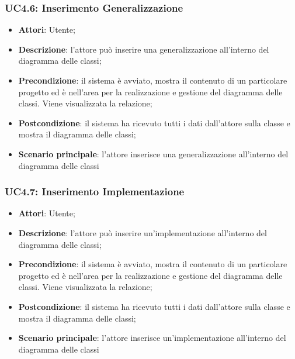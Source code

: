 \subsubsection{UC4.6: Inserimento Generalizzazione}
\label{UC4.6}
\begin{itemize}
	\item \textbf{Attori}: Utente;
	\item \textbf{Descrizione}: l'attore può inserire una generalizzazione all'interno del diagramma delle classi;
	\item \textbf{Precondizione}: il sistema è avviato, mostra il contenuto di un particolare progetto ed è nell'area per la realizzazione e gestione del diagramma delle classi. Viene visualizzata la relazione;
	\item \textbf{Postcondizione}: il sistema ha ricevuto tutti i dati dall'attore sulla classe e mostra il diagramma delle classi;
	\item \textbf{Scenario principale}: l'attore inserisce una generalizzazione all'interno del diagramma delle classi
\end{itemize}

\subsubsection{UC4.7: Inserimento Implementazione}
\label{UC4.7}
\begin{itemize}
	\item \textbf{Attori}: Utente;
	\item \textbf{Descrizione}: l'attore può inserire un'implementazione all'interno del diagramma delle classi;
	\item \textbf{Precondizione}: il sistema è avviato, mostra il contenuto di un particolare progetto ed è nell'area per la realizzazione e gestione del diagramma delle classi. Viene visualizzata la relazione;
	\item \textbf{Postcondizione}: il sistema ha ricevuto tutti i dati dall'attore sulla classe e mostra il diagramma delle classi;
	\item \textbf{Scenario principale}: l'attore inserisce un'implementazione all'interno del diagramma delle classi
\end{itemize}


